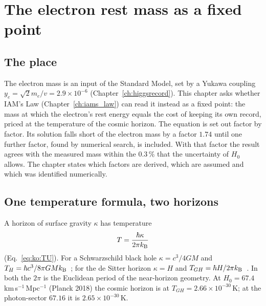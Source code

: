 \chapter{The electron rest mass as a fixed point}\label{ch:electronmass}

\section*{The place}
The electron mass is an input of the Standard Model, set by a Yukawa coupling $y_e=\sqrt2m_e/v=2.9\times10^{-6}$ (Chapter~\ref{ch:higgsrecord}).
This chapter asks whether IAM's Law (Chapter~\ref{ch:iams_law}) can read it instead as a fixed point: the mass at which the electron's rest energy
equals the cost of keeping its own record, priced at the temperature of the cosmic horizon. The equation is set out factor by factor. Its
solution falls short of the electron mass by a factor $1.74$ until one further factor, found by numerical search, is included. With that factor
the result agrees with the measured mass within the $0.3\,\%$ that the uncertainty of $H_0$ allows. The chapter states which factors are derived,
which are assumed and which was identified numerically.

\section{One temperature formula, two horizons}\label{sec:em:horizons}
A horizon of surface gravity $\kappa$ has temperature
\begin{equation}
T=\frac{\hbar\kappa}{2\pi k_{\mathrm B}}\label{eq:em:T}
\end{equation}
(Eq.~\eqref{eq:ko:TU}). For a Schwarzschild black hole $\kappa=c^3/4GM$ and $T_H=\hbar c^3/8\pi GMk_{\mathrm B}$~\cite{Hawking1975}; for the de Sitter horizon
$\kappa=H$ and $T_{GH}=\hbar H/2\pi k_{\mathrm B}$~\cite{GibbonsHawking1977}. In both the $2\pi$ is the Euclidean period of the near-horizon geometry. \derived{}
At $H_0=67.4$\,km\,s$^{-1}$\,Mpc$^{-1}$ (Planck 2018) the cosmic horizon is at $T_{GH}=2.66\times10^{-30}$\,K; at the photon-sector $67.16$ it is $2.65\times10^{-30}$\,K. \calc


